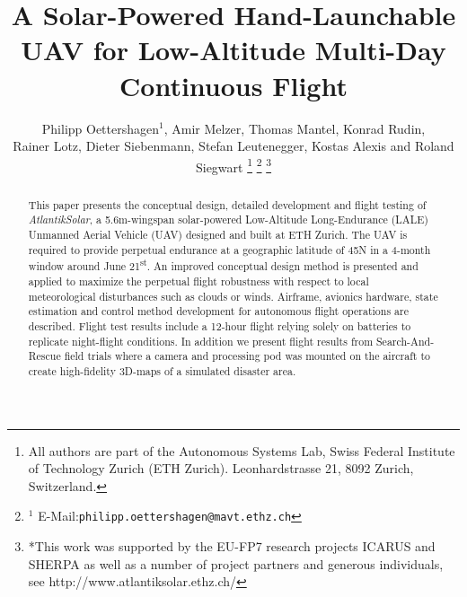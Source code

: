 \documentclass[letterpaper, 10 pt, conference]{ieeeconf}  %
\title{\LARGE \bf A Solar-Powered Hand-Launchable UAV for Low-Altitude Multi-Day Continuous Flight}
\author{Philipp Oettershagen$^{1}$, Amir Melzer, Thomas Mantel, Konrad Rudin, \\ Rainer Lotz, Dieter Siebenmann, Stefan Leutenegger, Kostas Alexis and Roland Siegwart%
\thanks{All authors are part of the Autonomous Systems Lab, Swiss Federal Institute of Technology Zurich (ETH Zurich). Leonhardstrasse 21, 8092 Zurich, Switzerland. }
\thanks{$^{1}$ E-Mail:{\tt philipp.oettershagen@mavt.ethz.ch}}%
\thanks{*This work was supported by the EU-FP7 research projects ICARUS and SHERPA as well as a number of project partners and generous individuals, see http://www.atlantiksolar.ethz.ch/  }%
 }
\begin{document}
\maketitle
\thispagestyle{empty}
\pagestyle{empty}

\begin{abstract}
This paper presents the conceptual design, detailed development and flight testing of \textit{AtlantikSolar}, a 5.6m-wingspan solar-powered Low-Altitude Long-Endurance (LALE) Unmanned Aerial Vehicle (UAV) designed and built at ETH Zurich. The UAV is required to provide perpetual endurance at a geographic latitude of 45\degree N in a 4-month window around June 21\textsuperscript{st}. An improved conceptual design method is presented and applied to maximize the perpetual flight robustness with respect to local meteorological disturbances such as clouds or winds. Airframe, avionics hardware, state estimation and control method development for autonomous flight operations are described. Flight test results include a 12-hour flight relying solely on batteries to replicate night-flight conditions. In addition we present flight results from Search-And-Rescue field trials where a camera and processing pod was mounted on the aircraft to create high-fidelity 3D-maps of a simulated disaster area. 
\end{abstract}








\end{document}
